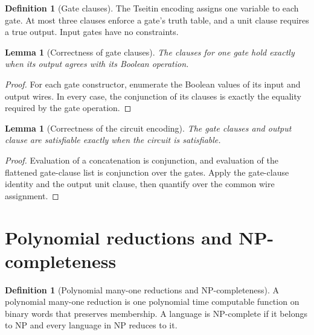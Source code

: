 \documentclass[11pt]{article}
\newtheorem{lemma}[theorem]{Lemma}
\theoremstyle{definition}
\newtheorem{definition}[theorem]{Definition}
\begin{document}
\begin{definition}[Gate clauses]\leavevmode
The Tseitin encoding assigns one variable to each gate. At most three
clauses enforce a gate's truth table, and a unit clause requires a true
output. Input gates have no constraints.

\end{definition}

\begin{lemma}[Correctness of gate clauses]\leavevmode
The clauses for one gate hold exactly when its output agrees with its
Boolean operation.

\end{lemma}
\begin{proof}\leavevmode
For each gate constructor, enumerate the Boolean values of its input and output wires. In every case, the conjunction of its clauses is exactly the equality required by the gate operation.\qedhere
\end{proof}

\begin{lemma}[Correctness of the circuit encoding]\leavevmode
The gate clauses and output clause are satisfiable exactly when the circuit is satisfiable.

\end{lemma}
\begin{proof}\leavevmode
Evaluation of a concatenation is conjunction, and evaluation of the flattened gate-clause list is conjunction over the gates. Apply the gate-clause identity and the output unit clause, then quantify over the common wire assignment.\qedhere
\end{proof}

\section{Polynomial reductions and NP-completeness}

\begin{definition}[Polynomial many-one reductions and NP-completeness]\leavevmode
A polynomial many-one reduction is one polynomial time computable function
on binary words that preserves membership. A language is NP-complete if it
belongs to NP and every language in NP reduces to it.

\end{definition}
\end{document}
